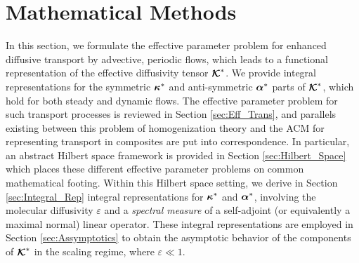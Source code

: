\documentclass[11pt]{amsart}
\newcommand\Kbc{\mbox{\boldmath${\mathcal{K}}$}}
\newcommand\balpha{\mbox{\boldmath${\alpha}$}}
\newcommand\bkappa{\mbox{\boldmath${\kappa}$}}
\begin{document}
\section{Mathematical Methods}\label{sec:Mathematical_Methods} 
%
In this section, we formulate the effective parameter problem for
enhanced diffusive transport by advective, periodic flows, which leads
to a functional representation of the effective diffusivity tensor
$\Kbc^*$. We provide integral representations for the symmetric
$\bkappa^*$ and anti-symmetric $\balpha^*$ parts of $\Kbc^*$, which
hold for both steady and dynamic flows. The effective parameter
problem
\cite{McLaughlin:SIAM_JAM:780,Fannjiang:SIAM_JAM:333,Biferale:PF:2725} 
for such transport processes is reviewed in Section
\ref{sec:Eff_Trans}, and parallels existing between this problem
of homogenization theory \cite{Bensoussan:Book:1978} and the ACM for
representing transport in composites \cite{Golden:CMP-473} are put
into correspondence. In particular, an abstract Hilbert space
framework is provided in Section \ref{sec:Hilbert_Space} which places
these different effective parameter problems on common mathematical
footing. Within this Hilbert space setting, we derive in Section
\ref{sec:Integral_Rep} integral representations for $\bkappa^*$ and
$\balpha^*$, involving the molecular diffusivity $\varepsilon$ and a
\emph{spectral measure} of a self-adjoint (or equivalently a maximal
normal) linear operator. These integral representations are employed
in Section \ref{sec:Assymptotics} to obtain the asymptotic behavior of
the components of $\Kbc^*$ in the scaling regime, where $\varepsilon\ll1$.  
\end{document}
